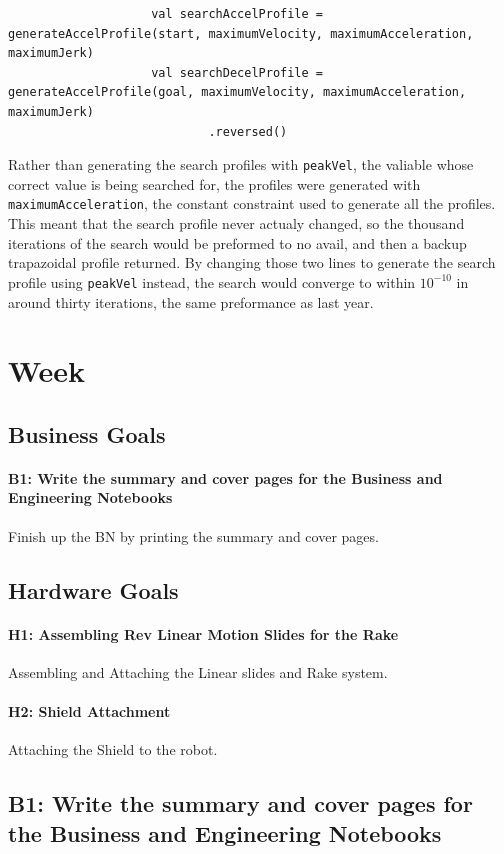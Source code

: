 \documentclass{article}
\begin{document}
\begin{lstlisting}
                    val searchAccelProfile = generateAccelProfile(start, maximumVelocity, maximumAcceleration, maximumJerk)
                    val searchDecelProfile = generateAccelProfile(goal, maximumVelocity, maximumAcceleration, maximumJerk)
                            .reversed()
\end{lstlisting}

Rather than generating the search profiles with \texttt{peakVel}, the valiable whose correct value is being searched for, the profiles were generated with \texttt{maximumAcceleration}, the constant constraint used to generate all the profiles. This meant that the search profile never actualy changed, so the thousand iterations of the search would be preformed to no avail, and then a backup trapazoidal profile returned. By changing those two  lines to generate the search profile using \texttt{peakVel} instead, the search would converge to within $10^{-10}$ in around thirty iterations, the same preformance as last year. 

\clearpage \newpage \section{Week \thesection} 
\subsection{Business Goals}
\paragraph{B1: Write the summary and cover pages for the Business and Engineering Notebooks}
 Finish up the BN by printing the summary and cover pages.
\subsection{Hardware Goals}
\paragraph{H1: Assembling Rev Linear Motion Slides for the Rake}
 Assembling and Attaching the Linear slides and Rake system.
\paragraph{H2: Shield Attachment}
Attaching the Shield to the robot.
\newpage
\subsection{B1: Write the summary and cover pages for the Business and Engineering Notebooks}
\end{document}
